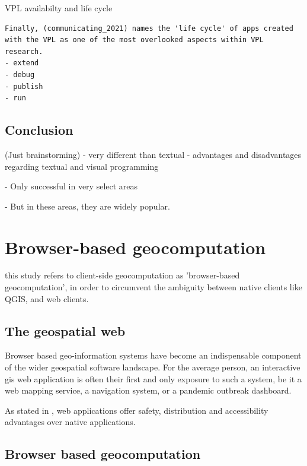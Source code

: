 VPL availabilty and life cycle
\begin{lstlisting}
Finally, (communicating_2021) names the 'life cycle' of apps created 
with the VPL as one of the most overlooked aspects within VPL research. 
- extend 
- debug
- publish
- run
\end{lstlisting}

\subsection{Conclusion}

(Just brainstorming)
- very different than textual 
- advantages and disadvantages regarding textual and visual programming

- Only successful in very select areas


- But in these areas, they are widely popular.



\section{Browser-based geocomputation}
\label{sec:related-geoweb}

this study refers to client-side geocomputation as 'browser-based geocomputation', in order to circumvent the ambiguity between native clients like QGIS, and web clients. 

\subsection{The geospatial web}

Browser based geo-information systems have become an indispensable component of the wider geospatial software landscape. 
For the average person, an interactive \ac{gis} web application is often their first and only exposure to such a system, be it a web mapping service, a navigation system, or a pandemic outbreak dashboard. 

As stated in , web applications offer safety, distribution and accessibility advantages over native applications.

\subsection{Browser based geocomputation}

